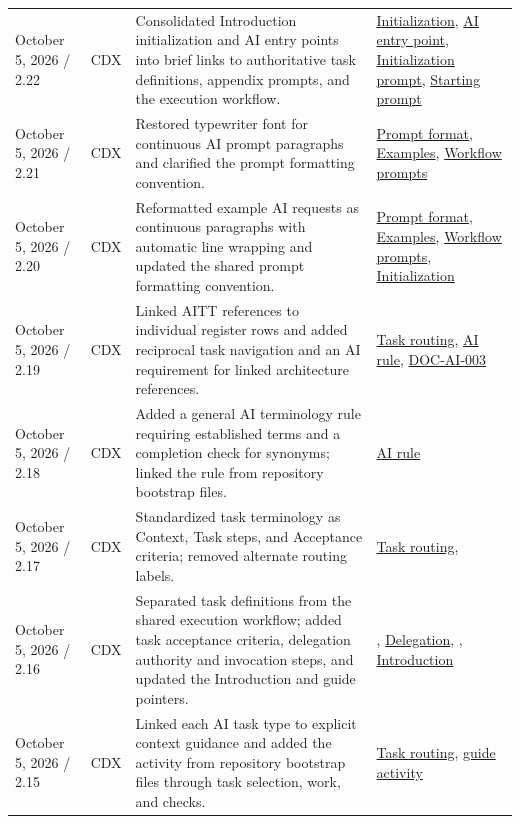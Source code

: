 \begin{tabularx}{\linewidth}{L{3.1cm}L{2.2cm}YL{2.0cm}}
October 5, 2026 / 2.22 & CDX & Consolidated Introduction initialization and AI entry points into brief links to authoritative task definitions, appendix prompts, and the execution workflow. & \hyperref[Section:InitializeNewProject]{Initiali\-zation}, \hyperref[Section:UsingTemplateAI]{AI entry point}, \hyperref[Section:AIInitializePrompt]{Initialization prompt}, \hyperref[Section:AIStartSelectedTaskPrompt]{Starting prompt}\\
October 5, 2026 / 2.21 & CDX & Restored typewriter font for continuous AI prompt paragraphs and clarified the prompt formatting convention. & \hyperref[Section:AIPromptFormatting]{Prompt format}, \hyperref[Section:AIExamplePrompts]{Examples}, \hyperref[Section:AIImplementationStart]{Workflow prompts}\\
October 5, 2026 / 2.20 & CDX & Reformatted example AI requests as continuous paragraphs with automatic line wrapping and updated the shared prompt formatting convention. & \hyperref[Section:AIPromptFormatting]{Prompt format}, \hyperref[Section:AIExamplePrompts]{Examples}, \hyperref[Section:AIImplementationStart]{Workflow prompts}, \hyperref[Section:InitializeNewProject]{Initiali\-zation}\\
October 5, 2026 / 2.19 & CDX & Linked AITT references to individual register rows and added reciprocal task navigation and an AI requirement for linked architecture references. & \hyperref[Table:AISkills]{Task routing}, \hyperref[Rule:AIReferenceLinks]{AI rule}, \hyperref[Requirement:DOCAI003]{DOC-AI-003}\\
October 5, 2026 / 2.18 & CDX & Added a general AI terminology rule requiring established terms and a completion check for synonyms; linked the rule from repository bootstrap files. & \hyperref[Rule:AITerminologyConsistency]{AI rule}\\
October 5, 2026 / 2.17 & CDX & Standardized task terminology as Context, Task steps, and Acceptance criteria; removed alternate routing labels. & \hyperref[Table:AISkills]{Task routing}, \\
October 5, 2026 / 2.16 & CDX & Separated task definitions from the shared execution workflow; added task acceptance criteria, delegation authority and invocation steps, and updated the Introduction and guide pointers. & , \hyperref[Section:AIAgentDelegation]{Delegation}, , \hyperref[Section:InitializeNewProject]{Introduction}\\
October 5, 2026 / 2.15 & CDX & Linked each AI task type to explicit context guidance and added the activity from repository bootstrap files through task selection, work, and checks. & \hyperref[Table:AISkills]{Task routing}, \hyperref[Figure:AIGuideActivity]{guide activity}\\

\end{tabularx}
